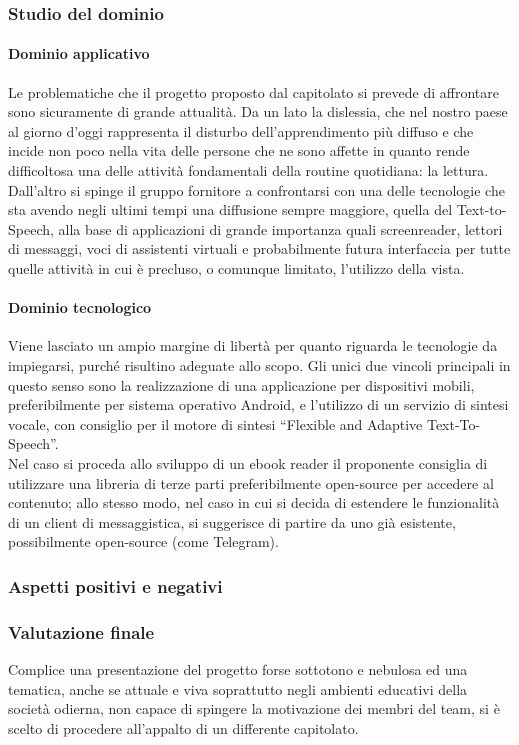 		\subsubsection{Studio del dominio}
			\paragraph{Dominio applicativo}
			Le problematiche che il progetto proposto dal capitolato si prevede di affrontare sono sicuramente di grande attualità. Da un lato la 
			dislessia, che nel nostro paese al giorno d'oggi rappresenta il disturbo dell'apprendimento più diffuso e che incide non poco nella 
			vita delle persone che ne sono affette in quanto rende difficoltosa una delle attività fondamentali della routine quotidiana: la lettura. 
			Dall'altro si spinge il gruppo fornitore a confrontarsi con una delle tecnologie che sta avendo negli ultimi tempi una diffusione sempre 
			maggiore, quella del Text-to-Speech, alla base di applicazioni di grande importanza quali screenreader, lettori di messaggi, voci di 
			assistenti virtuali e probabilmente futura interfaccia per tutte quelle attività in cui è precluso, o comunque limitato, l'utilizzo della vista.
			\paragraph{Dominio tecnologico}
			Viene lasciato un ampio margine di libertà per quanto riguarda le tecnologie da impiegarsi, purché risultino adeguate allo scopo. 
			Gli unici due vincoli principali in questo senso sono la realizzazione di una applicazione per dispositivi mobili, preferibilmente per 
			sistema operativo Android, e l'utilizzo di un servizio di sintesi vocale, con consiglio per il motore di sintesi “Flexible and Adaptive 
			Text-To-Speech”.
			\\Nel caso si proceda allo sviluppo di un ebook reader il proponente consiglia di utilizzare una libreria di terze parti preferibilmente 
			open-source per accedere al contenuto; allo stesso modo, nel caso in cui si decida di estendere le funzionalità di un client di messaggistica, 
			si suggerisce di partire da uno già esistente, possibilmente open-source (come Telegram).
		\subsubsection{Aspetti positivi e negativi}
		\subsubsection{Valutazione finale}
		Complice una presentazione del progetto forse sottotono e nebulosa ed una tematica, anche se attuale e viva soprattutto negli ambienti 
		educativi della società odierna, non capace di spingere la motivazione dei membri del team, si è scelto di procedere all'appalto di un 
		differente capitolato.
		
